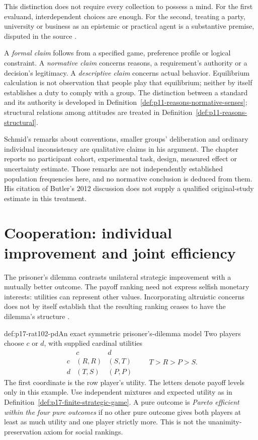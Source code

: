 This distinction does not require every collection to possess a mind.
For the first evaluand, interdependent choices are enough. For the second,
treating a party, university or business as an epistemic or practical agent
is a substantive premise, disputed in the source
\parencite[pp.~591--592, 594--596]{Schmid2021CollectiveRationality}.

A \emph{formal claim} follows from a specified game, preference profile or
logical constraint. A \emph{normative claim} concerns reasons, a requirement's
authority or a decision's legitimacy. A \emph{descriptive claim} concerns
actual behavior. Equilibrium calculation is not observation that people
play that equilibrium; neither by itself establishes a duty to comply with
a group. The distinction between a standard and its authority is developed
in Definition~\ref{def:p11-reasons-normative-senses}; structural relations
among attitudes are treated in Definition~\ref{def:p11-reasons-structural}.

Schmid's remarks about conventions, smaller groups' deliberation and ordinary
individual inconsistency are qualitative claims in his argument. The chapter
reports no participant cohort, experimental task, design, measured effect
or uncertainty estimate. Those remarks are not independently established
population frequencies here, and no normative conclusion is deduced from
them. His citation of Butler's 2012 discussion does not supply a qualified
original-study estimate in this treatment.

\section{Cooperation: individual improvement and joint efficiency}
\label{sec:p17-rat102-cooperation}

The prisoner's dilemma contrasts unilateral strategic improvement with a
mutually better outcome. The payoff ranking need not express selfish
monetary interests: utilities can represent other values. Incorporating
altruistic concerns does not by itself establish that the resulting ranking
ceases to have the dilemma's structure
\parencite[p.~592]{Schmid2021CollectiveRationality}.

\begin{hbdefinition}{def:p17-rat102-pd}{An exact symmetric prisoner's-dilemma model}
Two players choose \(c\) or \(d\), with supplied cardinal utilities
\[
 \begin{array}{c|cc}
      &c&d\\ \hline
 c&(R,R)&(S,T)\\
 d&(T,S)&(P,P)
 \end{array}
 \qquad T>R>P>S.
\]
The first coordinate is the row player's utility. The letters denote
payoff levels only in this example. Use independent mixtures and expected
utility as in Definition~\ref{def:p17-finite-strategic-game}.
A pure outcome is \emph{Pareto efficient within the four pure outcomes}
if no other pure outcome gives both players at least as much utility and
one player strictly more. This is not the unanimity-preservation axiom
for social rankings.
\end{hbdefinition}

